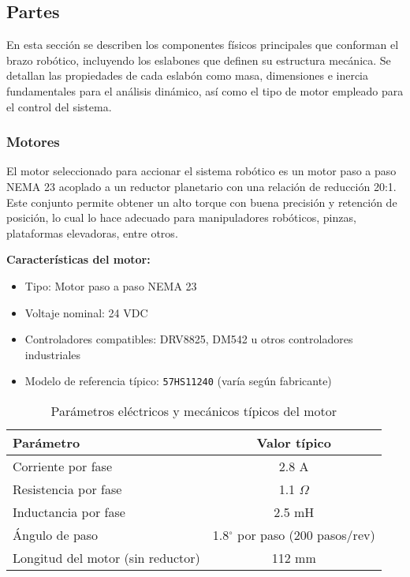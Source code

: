 \subsection{Partes} \label{subsec:partes}
En esta sección se describen los componentes físicos principales que conforman el brazo robótico, incluyendo los eslabones que definen su estructura mecánica. Se detallan las propiedades de cada eslabón como masa, dimensiones e inercia fundamentales para el análisis dinámico, así como el tipo de motor empleado para el control del sistema.

\subsubsection{Motores} \label{subsubsec:motores}
El motor seleccionado para accionar el sistema robótico es un motor paso a paso NEMA 23 acoplado a un reductor planetario con una relación de reducción 20:1. Este conjunto permite obtener un alto torque con buena precisión y retención de posición, lo cual lo hace adecuado para manipuladores robóticos, pinzas, plataformas elevadoras, entre otros.

\textbf{Características del motor:}

\begin{itemize}
	\item Tipo: Motor paso a paso NEMA 23
	\item Voltaje nominal: 24 VDC
	\item Controladores compatibles: DRV8825, DM542 u otros controladores industriales
	\item Modelo de referencia típico: \texttt{57HS11240} (varía según fabricante)
\end{itemize}

\begin{table}[H]
	\centering
	\caption{Parámetros eléctricos y mecánicos típicos del motor}
	\begin{tabular}{|l|c|}
		\hline
		\textbf{Parámetro} & \textbf{Valor típico} \\
		\hline
		Corriente por fase & 2.8 A \\
		Resistencia por fase & 1.1 $\Omega$ \\
		Inductancia por fase & 2.5 mH \\
		Ángulo de paso & 1.8$^\circ$ por paso (200 pasos/rev) \\
		Longitud del motor (sin reductor) & 112 mm \\
		\hline
	\end{tabular}
\end{table}

